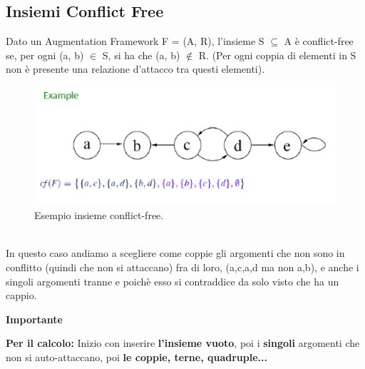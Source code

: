 \subsection{Insiemi Conflict Free}
Dato un Augmentation Framework F = (A, R), l’insieme S $\subseteq$ A è conflict-free se, per ogni (a, b) $\in$ S, si ha che (a, b) $\notin$ R. (Per ogni coppia di elementi in S non è presente una relazione d’attacco tra questi elementi).
\begin{figure}[htp]
	\centering
    \includegraphics[width=12cm, keepaspectratio]{img/Cap6/cf.png}
    \caption{Esempio insieme conflict-free.}
\end{figure}
\\In questo caso andiamo a scegliere come coppie gli argomenti che non sono in conflitto (quindi che non si attaccano) fra di loro, ({a,c},{a,d} ma non {a,b}), e anche i singoli argomenti tranne e poichè esso si contraddice da solo visto che ha un cappio.
\begin{center}
    \textbf{Importante}
\end{center}
\textbf{Per il calcolo:} Inizio con inserire \textbf{l’insieme vuoto}, poi i \textbf{singoli} argomenti che non si auto-attaccano, poi \textbf{le coppie, terne, quadruple...}
\newpage
